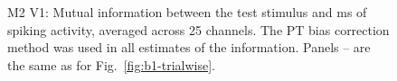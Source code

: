 \begin{figure}[htbp]
\begin{subfigure}[b]{0.5\linewidth}
    \end{subfigure}
    \caption{M2 V1: Mutual information between the test stimulus and \unit[20]{ms} of spiking activity, averaged across 25 channels.
The PT bias correction method was used in all estimates of the information.
Panels -- are the same as for Fig.~\ref{fig:b1-trialwise}.
}
    \label{fig:j1-trialwise}
\end{figure}

